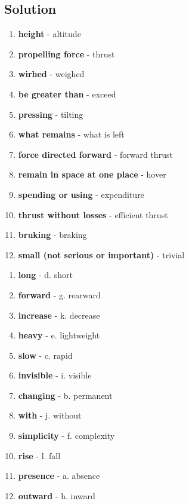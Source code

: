 \subsection*{Solution}

\begin{enumerate}
      \item \textbf{height} - altitude
      \item \textbf{propelling force} - thrust
      \item \textbf{wirhed} - weighed
      \item \textbf{be greater than} - exceed
      \item \textbf{pressing} - tilting
      \item \textbf{what remains} - what is left
      \item \textbf{force directed forward} - forward thrust
      \item \textbf{remain in space at one place} - hover
      \item \textbf{spending or using} - expenditure
      \item \textbf{thrust without losses} - efficient thrust
      \item \textbf{bruking} - braking
      \item \textbf{small (not serious or important)} - trivial
\end{enumerate}

\begin{enumerate}
      \item \textbf{long} - d. short
      \item \textbf{forward} - g. rearward
      \item \textbf{increase} - k. decrease
      \item \textbf{heavy} - e. lightweight
      \item \textbf{slow} - c. rapid
      \item \textbf{invisible} - i. visible
      \item \textbf{changing} - b. permanent
      \item \textbf{with} - j. without
      \item \textbf{simplicity} - f. complexity
      \item \textbf{rise} - l. fall
      \item \textbf{presence} - a. absence
      \item \textbf{outward} - h. inward
\end{enumerate}

